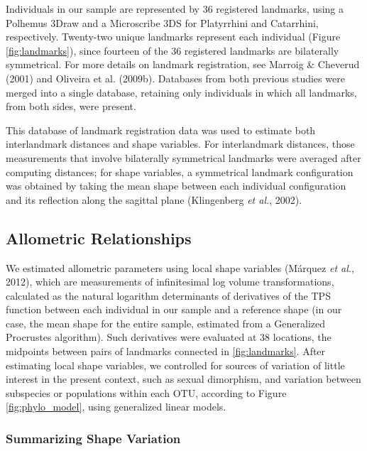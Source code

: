 \documentclass[12pt,twoside]{report}
\begin{document}
Individuals in our sample are represented by 36 registered landmarks,
using a Polhemus 3Draw and a Microscribe 3DS for Platyrrhini and
Catarrhini, respectively. Twenty-two unique landmarks represent each
individual (Figure \ref{fig:landmarks}), since fourteen of the 36
registered landmarks are bilaterally symmetrical. For more details on
landmark registration, see Marroig \& Cheverud (2001) and Oliveira et
al. (2009b). Databases from both previous studies were merged into a
single database, retaining only individuals in which all landmarks, from
both sides, were present.

This database of landmark registration data was used to estimate both
interlandmark distances and shape variables. For interlandmark
distances, those measurements that involve bilaterally symmetrical
landmarks were averaged after computing distances; for shape variables,
a symmetrical landmark configuration was obtained by taking the mean
shape between each individual configuration and its reflection along the
sagittal plane (Klingenberg \emph{et al.}, 2002).

\subsection{Allometric Relationships}\label{allometric-relationships}

We estimated allometric parameters using local shape variables (Márquez
\emph{et al.}, 2012), which are measurements of infinitesimal log volume
transformations, calculated as the natural logarithm determinants of
derivatives of the TPS function between each individual in our sample
and a reference shape (in our case, the mean shape for the entire
sample, estimated from a Generalized Procrustes algorithm). Such
derivatives were evaluated at 38 locations, the midpoints between pairs
of landmarks connected in \autoref{fig:landmarks}. After estimating
local shape variables, we controlled for sources of variation of little
interest in the present context, such as sexual dimorphism, and
variation between subspecies or populations within each OTU, according
to Figure \ref{fig:phylo_model}, using generalized linear models.

\subsubsection{Summarizing Shape
Variation}\label{summarizing-shape-variation}
\end{document}
